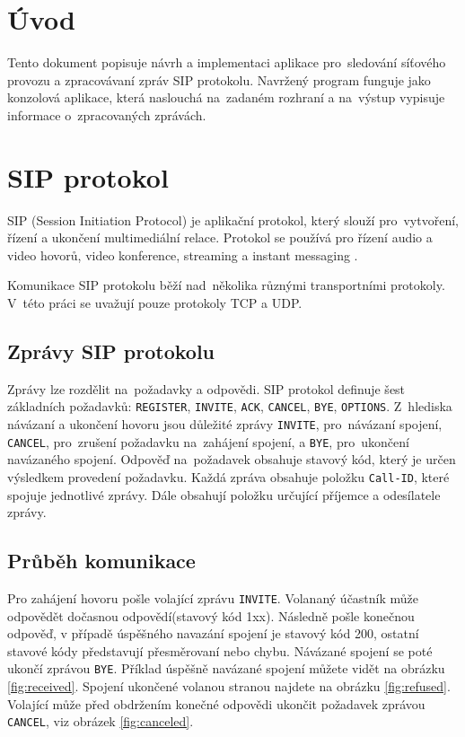 \documentclass[11pt,a4paper]{article}
\begin{document}
\def\author{Pavel Frýz}
\def\email{xfryzp00@stud.fit.vutbr.cz}
\def\projname{Programování síťové služby}


\tableofcontents
\newpage

\section{Úvod}
Tento dokument popisuje návrh a implementaci aplikace pro~sledování
síťového provozu a zpracovávaní zpráv SIP protokolu. Navržený program funguje
jako konzolová aplikace, která naslouchá na~zadaném rozhraní a na~výstup vypisuje 
informace o~zpracovaných zprávách.

\section{SIP protokol}\label{sip}
SIP (Session Initiation Protocol) je aplikační protokol, který slouží pro~vytvoření,
řízení a ukončení multimediální relace. Protokol se používá pro řízení audio a
video hovorů, video konference, streaming a instant messaging \cite{rfc3261}.

Komunikace SIP protokolu běží nad~několika různými transportními
protokoly. V~této práci se uvažují pouze protokoly TCP a UDP.  

\subsection{Zprávy SIP protokolu}
Zprávy lze rozdělit na~požadavky a odpovědi. SIP protokol definuje
šest základních požadavků: \texttt{REG\-IS\-TER}, \texttt{INVITE},
\texttt{ACK}, \texttt{CANCEL}, \texttt{BYE}, \texttt{OPTIONS}.
Z~hlediska návázaní a ukončení hovoru jsou důležité zprávy
\texttt{INVITE}, pro~návázaní spojení, \texttt{CANCEL}, pro~zrušení 
požadavku na~zahájení spojení, a \texttt{BYE}, pro~ukončení
navázaného spojení. Odpověď na~požadavek obsahuje stavový kód, který
je určen výsledkem provedení požadavku. Každá zpráva obsahuje položku \texttt{Call-ID},
které spojuje jednotlivé zprávy. Dále obsahují položku určující příjemce a odesílatele
zprávy.

\subsection{Průběh komunikace}
Pro zahájení hovoru pošle volající zprávu \texttt{INVITE}.
Volananý účastník může odpovědět dočasnou odpovědí(stavový kód 1xx).
Následně pošle konečnou odpověď, v případě úspěšného navazání spojení je
stavový kód 200, ostatní stavové kódy představují přesměrovaní nebo chybu.
Návázané spojení se poté ukončí zprávou \texttt{BYE}. Příklad úspěšně navázané spojení 
můžete vidět na obrázku \ref{fig:received}. Spojení ukončené volanou stranou najdete na obrázku \ref{fig:refused}.
Volající může před obdržením konečné odpovědi ukončit požadavek zprávou \texttt{CANCEL}, viz obrázek \ref{fig:canceled}.
\end{document}
